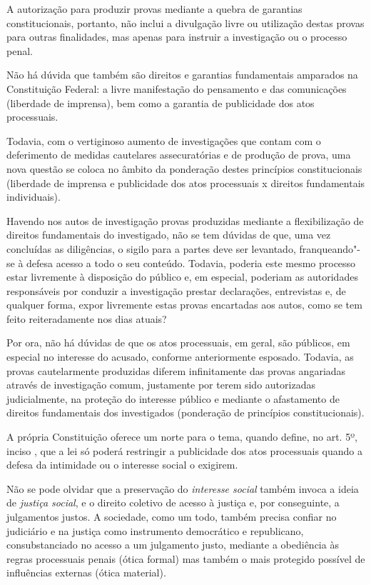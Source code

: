 A autorização para produzir provas mediante a quebra de garantias
constitucionais, portanto, não inclui a divulgação livre ou utilização
destas provas para outras finalidades, mas apenas para instruir a
investigação ou o processo penal.

Não há dúvida que também são direitos e garantias fundamentais amparados
na Constituição Federal: a livre manifestação do pensamento e das
comunicações (liberdade de imprensa), bem como a garantia de publicidade
dos atos processuais.

Todavia, com o vertiginoso aumento de investigações que contam com o
deferimento de medidas cautelares assecuratórias e de produção de prova,
uma nova questão se coloca no âmbito da ponderação destes princípios
constitucionais (liberdade de imprensa e publicidade dos atos
processuais x direitos fundamentais individuais).

Havendo nos autos de investigação provas produzidas mediante a
flexibilização de direitos fundamentais do investigado, não se tem
dúvidas de que, uma vez concluídas as diligências, o sigilo para a
partes deve ser levantado, franqueando"-se à defesa acesso a todo o seu
conteúdo. Todavia, poderia este mesmo processo estar livremente à
disposição do público e, em especial, poderiam as autoridades
responsáveis por conduzir a investigação prestar declarações,
entrevistas e, de qualquer forma, expor livremente estas provas
encartadas aos autos, como se tem feito reiteradamente nos dias atuais?

Por ora, não há dúvidas de que os atos processuais, em geral, são
públicos, em especial no interesse do acusado, conforme anteriormente
esposado. Todavia, as provas cautelarmente produzidas diferem
infinitamente das provas angariadas através de investigação comum,
justamente por terem sido autorizadas judicialmente, na proteção do
interesse público e mediante o afastamento de direitos fundamentais dos
investigados (ponderação de princípios constitucionais).

A própria Constituição oferece um norte para o tema, quando define, no
art. 5º, inciso , que a lei só poderá restringir a publicidade dos
atos processuais quando a defesa da intimidade ou o interesse social o
exigirem.

Não se pode olvidar que a preservação do \emph{interesse social} também
invoca a ideia de \emph{justiça social}, e o direito coletivo de acesso
à justiça e, por conseguinte, a julgamentos justos. A sociedade, como um
todo, também precisa confiar no judiciário e na justiça como instrumento
democrático e republicano, consubstanciado no acesso a um julgamento
justo, mediante a obediência às regras processuais penais (ótica formal)
mas também o mais protegido possível de influências externas (ótica
material).

